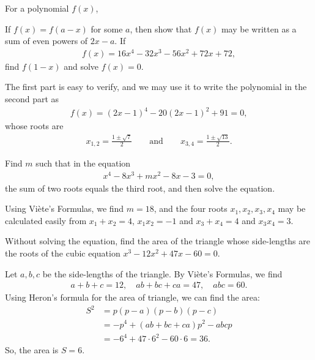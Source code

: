 \documentclass[12pt,a4paper]{memoir}
\theoremstyle{definition}
\begin{document}
\begin{question}
	For a polynomial $f(x)$,
	\begin{tasks}
		\task If $f(x)=f(a-x)$ for some $a$, then show that $f(x)$ may be written as a sum of even powers of $2x-a$.
		\task If 
		\begin{align*}
			f(x) = 16x^4 - 32x^3 - 56x^2 + 72x + 72,
		\end{align*}
		find $f(1-x)$ and solve $f(x)=0$.
	\end{tasks}
\end{question}

\begin{solution}
	The first part is easy to verify, and we may use it to write the polynomial in the second part as
	\begin{align*}
		f(x) = (2x-1)^4 - 20(2x-1)^2 + 91 = 0,
	\end{align*}
	whose roots are
	\begin{align*}
		x_{1,2} = \frac{1\pm\sqrt{7}}{2} \qquad \text{and} \qquad x_{3,4} = \frac{1\pm\sqrt{13}}{2}.
	\end{align*}
\end{solution}


\begin{question}
	Find $m$ such that in the equation
	\begin{align*}
		x^4 - 8x^3 + mx^2 - 8x - 3 =0,
	\end{align*}
	the sum of two roots equals the third root, and then solve the equation.
\end{question}

\begin{solution}
	Using Viète's Formulas, we find $m=18$, and the four roots $x_1,x_2,x_3,x_4$ may be calculated easily from  $x_1+x_2=4$, $x_1x_2=-1$ and $x_3+x_4=4$ and $x_3x_4=3$.
\end{solution}

\begin{question}
	Without solving the equation, find the area of the triangle whose side-lengths are the roots of the cubic equation $x^3 - 12x^2 + 47x - 60 = 0$.
\end{question}

\begin{solution}
	Let $a,b,c$ be the side-lengths of the triangle. By Viète's Formulas, we find
	\begin{align*}
		a+b+c=12, \quad ab+bc+ca = 47, \quad abc = 60.
	\end{align*}
	Using Heron's formula for the area of triangle, we can find the area:
	\begin{align*}
		S^2 &= p(p-a)(p-b)(p-c) \\
		&= -p^4 + (ab+bc+ca)p^2 - abcp\\
		&= -6^4 + 47\cdot 6^2 - 60\cdot 6  = 36.
	\end{align*}
	So, the area is $S=6$.
\end{solution}
\end{document}
